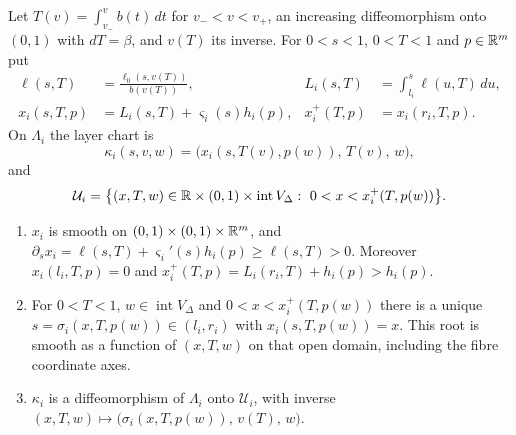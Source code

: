 \begin{construction}\label{cons:str-layer-coords}
Let $T(v)=\int_{v_-}^vb(t)\,dt$ for $v_-<v<v_+$, an increasing diffeomorphism onto $(0,1)$ with $dT=\beta$, and $v(T)$ its
inverse. For $0<s<1$, $0<T<1$ and $p\in\mathbb{R}^m$ put
\begin{align*}
 \ell(s,T)&=\frac{\ell_0(s,v(T))}{b(v(T))},&
 L_i(s,T)&=\int_{l_i}^s\ell(u,T)\,du,\\
 x_i(s,T,p)&=L_i(s,T)+\varsigma_i(s)h_i(p),&
 x_i^+(T,p)&=x_i(r_i,T,p).
\end{align*}
On $\Lambda_i$ the layer chart is
\[
 \kappa_i(s,v,w)=\big(x_i(s,T(v),p(w)),\,T(v),\,w\big),
\]
and
\[
 \mathcal U_i=\big\{(x,T,w)\in\R\times(0,1)\times\operatorname{int}V_\Delta:\ 0<x<x_i^+(T,p(w))\big\}.
\]
\end{construction}

\begin{lemma}\label{lem:str-layer-root}
\begin{enumerate}[label=(\roman*)]
\item $x_i$ is smooth on $(0,1)\times(0,1)\times\mathbb{R}^m$, and
$\partial_sx_i=\ell(s,T)+\varsigma_i'(s)h_i(p)\ge\ell(s,T)>0$. Moreover $x_i(l_i,T,p)=0$ and
$x_i^+(T,p)=L_i(r_i,T)+h_i(p)>h_i(p)$.
\item For $0<T<1$, $w\in\operatorname{int}V_\Delta$ and $0<x<x_i^+(T,p(w))$ there is a unique
$s=\sigma_i(x,T,p(w))\in(l_i,r_i)$ with $x_i(s,T,p(w))=x$. This root is smooth as a function
of $(x,T,w)$ on that open domain, including the fibre coordinate axes.
\item $\kappa_i$ is a diffeomorphism of $\Lambda_i$ onto $\mathcal U_i$, with inverse
$(x,T,w)\mapsto\big(\sigma_i(x,T,p(w)),\,v(T),\,w\big)$.
\end{enumerate}
\end{lemma}

